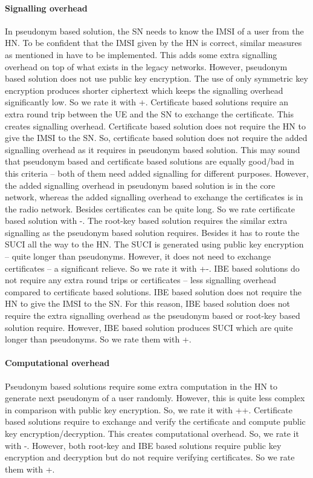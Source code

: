 \documentclass[conference]{IEEEtran}
\begin{document}
\paragraph{Signalling overhead}
In pseudonym based solution, the SN needs to know the IMSI of a user from the HN. To be confident that the IMSI given by the HN is correct, similar measures as mentioned in \cite{NokiaLI,NokiaLI1,EricssonLI,CATTLI,KPNDOCOMOLI} have to be implemented. This adds some extra signalling overhead on top of what exists in the legacy networks. However, pseudonym based solution does not use public key encryption. The use of only symmetric key encryption produces shorter ciphertext which keeps the signalling overhead significantly low. So we rate it with +.
Certificate based solutions require an extra round trip between the UE and the SN to exchange the certificate. This creates signalling overhead. Certificate based solution does not require the HN to give the IMSI to the SN. So, certificate based solution does not require the added signalling overhead as it requires in pseudonym based solution. This may sound that pseudonym based and certificate based solutions are equally good/bad in this criteria -- both of them need added signalling for different purposes. However, the added signalling overhead in pseudonym based solution is in the core network, whereas the added signalling overhead to exchange the certificates is in the radio network. Besides certificates can be quite long. So we rate certificate based solution with -. The root-key based solution requires the similar extra signalling as the pseudonym based solution requires. Besides it has to route the SUCI all the way to the HN. The SUCI is generated using public key encryption -- quite longer than pseudonyms. However, it does not need to exchange certificates -- a significant relieve. So we rate it with +-. IBE based solutions do not require any extra round trips or certificates -- less signalling overhead compared to certificate based solutions. IBE based solution does not require the HN to give the IMSI to the SN. For this reason, IBE based solution does not require the extra signalling overhead as the pseudonym based or root-key based solution require. However, IBE based solution produces SUCI which are quite longer than pseudonyms. So we rate them with +.

\paragraph{Computational overhead}
Pseudonym based solutions require some extra computation in the HN to generate next pseudonym of a user randomly. However, this is quite less complex in comparison with public key encryption. So, we rate it with ++. Certificate based solutions require to exchange and verify the certificate and compute public key encryption/decryption. This creates computational overhead. So, we rate it with -. However, both root-key and IBE based solutions require public key encryption and decryption but do not require verifying certificates. So we rate them with +.
\end{document}

